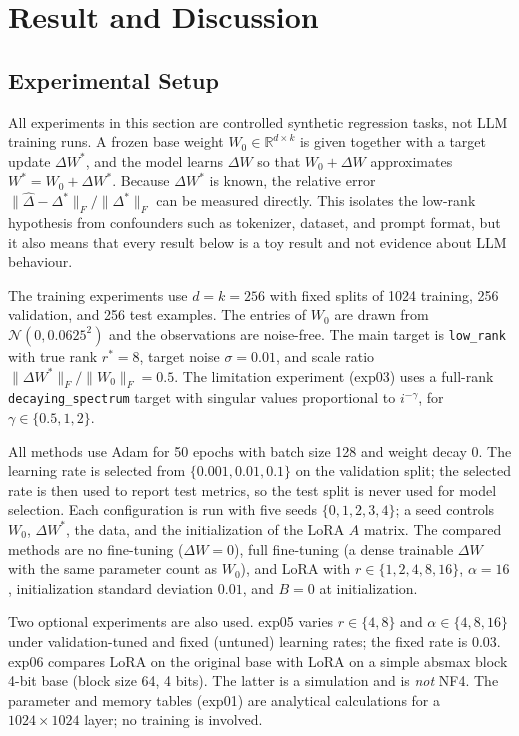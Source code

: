 \section{Result and Discussion}

\subsection{Experimental Setup}

All experiments in this section are controlled synthetic regression tasks, not LLM training runs. A frozen base weight $W_0 \in \mathbb{R}^{d\times k}$ is given together with a target update $\Delta W^{*}$, and the model learns $\Delta W$ so that $W_0+\Delta W$ approximates $W^{*}=W_0+\Delta W^{*}$. Because $\Delta W^{*}$ is known, the relative error $\|\hat{\Delta}-\Delta^{*}\|_F/\|\Delta^{*}\|_F$ can be measured directly. This isolates the low-rank hypothesis from confounders such as tokenizer, dataset, and prompt format, but it also means that every result below is a toy result and not evidence about LLM behaviour.

The training experiments use $d=k=256$ with fixed splits of 1024 training, 256 validation, and 256 test examples. The entries of $W_0$ are drawn from $\mathcal{N}(0,0.0625^2)$ and the observations are noise-free. The main target is \texttt{low\_rank} with true rank $r^{*}=8$, target noise $\sigma=0.01$, and scale ratio $\|\Delta W^{*}\|_F/\|W_0\|_F=0.5$. The limitation experiment (exp03) uses a full-rank \texttt{decaying\_spectrum} target with singular values proportional to $i^{-\gamma}$, for $\gamma\in\{0.5,1,2\}$.

All methods use Adam for 50 epochs with batch size 128 and weight decay $0$. The learning rate is selected from $\{0.001,0.01,0.1\}$ on the validation split; the selected rate is then used to report test metrics, so the test split is never used for model selection. Each configuration is run with five seeds $\{0,1,2,3,4\}$; a seed controls $W_0$, $\Delta W^{*}$, the data, and the initialization of the LoRA $A$ matrix. The compared methods are no fine-tuning ($\Delta W=0$), full fine-tuning (a dense trainable $\Delta W$ with the same parameter count as $W_0$), and LoRA with $r\in\{1,2,4,8,16\}$, $\alpha=16$, initialization standard deviation $0.01$, and $B=0$ at initialization.

Two optional experiments are also used. exp05 varies $r\in\{4,8\}$ and $\alpha\in\{4,8,16\}$ under validation-tuned and fixed (untuned) learning rates; the fixed rate is $0.03$. exp06 compares LoRA on the original base with LoRA on a simple absmax block 4-bit base (block size 64, 4 bits). The latter is a simulation and is \emph{not} NF4. The parameter and memory tables (exp01) are analytical calculations for a $1024\times1024$ layer; no training is involved.

